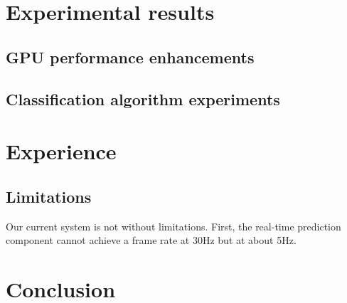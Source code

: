 \documentclass[letterpaper,twocolumn,10pt]{article}
\begin{document}


\section{Experimental results}
\subsection{GPU performance enhancements}
\subsection{Classification algorithm experiments}



\section{Experience}
\subsection{Limitations}
Our current system is not without limitations. First, the real-time prediction component cannot achieve a frame rate at 30Hz but at about 5Hz.
\section{Conclusion}
\end{document}
